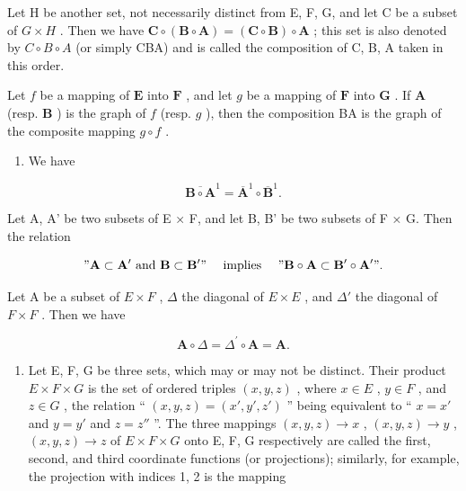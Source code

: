 Let H be another set, not necessarily distinct from E, F, G, and let C be a subset of \(G \times H\) . Then we have \(\mathbf{C} \circ (\mathbf{B} \circ \mathbf{A}) = (\mathbf{C} \circ \mathbf{B}) \circ \mathbf{A}\) ; this set is also denoted by \(C \circ B \circ A\) (or simply CBA) and is called the composition of C, B, A taken in this order.

Let \(f\) be a mapping of \(\mathbf{E}\) into \(\mathbf{F}\) , and let \(g\) be a mapping of \(\mathbf{F}\) into \(\mathbf{G}\) . If \(\mathbf{A}\) (resp. \(\mathbf{B}\) ) is the graph of \(f\) (resp. \(g\) ), then the composition BA is the graph of the composite mapping \(g \circ f\) .

\begin{enumerate}
\def\labelenumi{\arabic{enumi}.}
\setcounter{enumi}{10}
\tightlist
\item
  We have
\end{enumerate}

\[
\overline{\mathbf {B} \circ \mathbf {A}}^{1} = \overline {\mathbf {A}}^{1} \circ \overline {\mathbf {B}}^{1}.\tag{31}
\]

Let A, A' be two subsets of E × F, and let B, B' be two subsets of F × G. Then the relation

\[
" \mathbf {A} \subset \mathbf {A} ^ {\prime} \text {   and   } \mathbf {B} \subset \mathbf {B} ^ {\prime}" \quad \text { implies } \quad " \mathbf {B} \circ \mathbf {A} \subset \mathbf {B} ^ {\prime} \circ \mathbf {A} ^ {\prime}".
\]

Let A be a subset of \(E \times F\) , \(\Delta\) the diagonal of \(E \times E\) , and \(\Delta'\) the diagonal of \(F \times F\) . Then we have

\[
\mathbf {A} \circ \Delta = \Delta^ {\prime} \circ \mathbf {A} = \mathbf {A}.\tag{32}
\]

\begin{enumerate}
\def\labelenumi{\arabic{enumi}.}
\setcounter{enumi}{11}
\tightlist
\item
  Let E, F, G be three sets, which may or may not be distinct. Their product \(E \times F \times G\) is the set of ordered triples \((x, y, z)\) , where \(x \in E\) , \(y \in F\) , and \(z \in G\) , the relation `` \((x, y, z) = (x', y', z')\) '' being equivalent to `` \(x = x'\) and \(y = y'\) and \(z = z''\) ''. The three mappings \((x, y, z) \to x\) , \((x, y, z) \to y\) , \((x, y, z) \to z\) of \(E \times F \times G\) onto E, F, G respectively are called the first, second, and third coordinate functions (or projections); similarly, for example, the projection with indices 1, 2 is the mapping
\end{enumerate}

